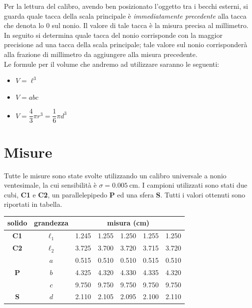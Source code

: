 \documentclass[12pt]{scrartcl}
\begin{document}
Per la lettura del calibro, avendo ben posizionato l'oggetto tra i becchi esterni,
si guarda quale tacca della scala principale è \emph{immediatamente precedente} alla
tacca che denota lo \(0\) sul nonio. Il valore di tale tacca è la misura precisa al
millimetro. In seguito si determina quale tacca del nonio corrisponde con la maggior
precisione ad una tacca della scala principale; tale valore sul nonio corrisponderà
alla frazione di millimetro da aggiungere alla misura precedente.\\[1em]
Le formule per il volume che andremo ad utilizzare saranno le seguenti:

\begin{itemize}
  \item {} \(V = \ell^3\)
  \item {} \(V = abc\)
  \item {} \(V = \dfrac{4}{3} \pi r^3 = \dfrac{1}{6} \pi d^3\)
\end{itemize}


\section{Misure}

Tutte le misure sono state svolte utilizzando un calibro universale a nonio ventesimale,
la cui sensibilità è \(\sigma = \SI{0.005}{\centi\metre}\). I campioni utilizzati sono
stati due cubi, \textbf{C1} e \textbf{C2}, un parallelepipedo \textbf{P} ed una
sfera \textbf{S}. Tutti i valori ottenuti sono riportati in tabella.

\begin{center}\begin{tabular}{ccccccc}
  \toprule
  \textbf{solido} & \textbf{grandezza} & \multicolumn{5}{c}{\textbf{misura} (\si{\centi\metre})} \\
  \midrule
  \textbf{C1} & \(\ell_1\) & \num{1.245} & \num{1.255} & \num{1.250} & \num{1.255} & \num{1.250} \\
  \midrule
  \textbf{C2} & \(\ell_2\) & \num{3.725} & \num{3.700} & \num{3.720} & \num{3.715} & \num{3.720} \\
  \midrule
  \multirow{3}{*}{\textbf{P}} & \(a\) & \num{0.515} & \num{0.510} & \num{0.510} & \num{0.515} & \num{0.510} \\
                              & \(b\) & \num{4.325} & \num{4.320} & \num{4.330} & \num{4.335} & \num{4.320} \\
                              & \(c\) & \num{9.750} & \num{9.750} & \num{9.750} & \num{9.750} & \num{9.750} \\
  \midrule
  \textbf{S} & \(d\) & \num{2.110} & \num{2.105} & \num{2.095} & \num{2.100} & \num{2.110} \\
  \bottomrule
\end{tabular}\end{center}
\end{document}

